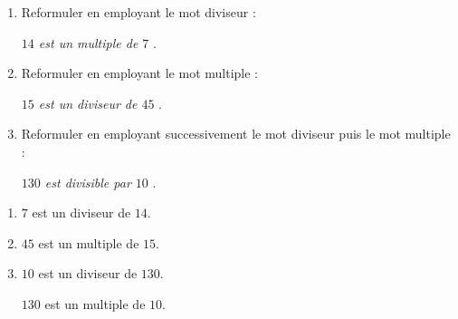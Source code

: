 \begin{exercice*}
    \begin{enumerate}
        \item Reformuler en employant le mot diviseur :
        
        \textit{\og $14$ est un multiple de $7$ \fg}.
        \item Reformuler en employant le mot multiple :
        
        \textit{\og $15$ est un diviseur de $45$ \fg}.
        \item Reformuler en employant successivement le mot diviseur puis le mot multiple :
        
        \textit{\og $130$ est divisible par $10$ \fg}.
    \end{enumerate}
\end{exercice*}
\begin{corrige}
    \begin{enumerate}
        \item $7$ est un diviseur de $14$.
        \item $45$ est un multiple de $15$.
        \item $10$ est un diviseur de $130$.
        
        $130$ est un multiple de $10$.
    \end{enumerate}
\end{corrige}

